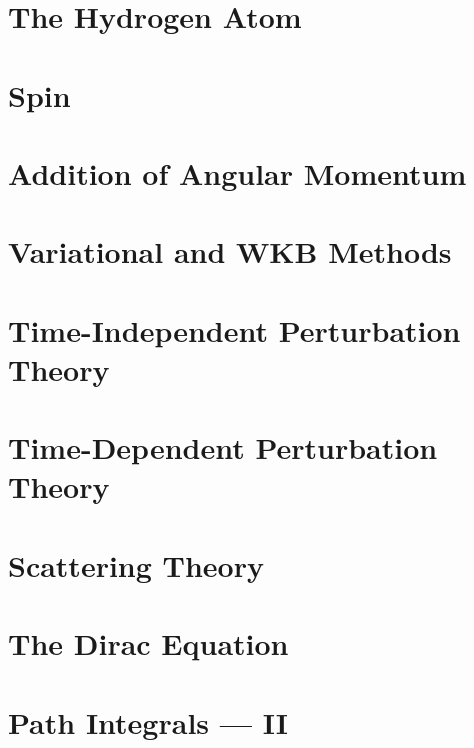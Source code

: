 \documentclass[11pt, a4paper, latinreim, shortsets]{notes}
\begin{document}
\chapter{The Hydrogen Atom}
\chapter{Spin}
\chapter{Addition of Angular Momentum}
\chapter{Variational and WKB Methods}
\chapter{Time-Independent Perturbation Theory}
\chapter{Time-Dependent Perturbation Theory}
\chapter{Scattering Theory}
\chapter{The Dirac Equation}
\chapter{Path Integrals --- II}
\end{document}

